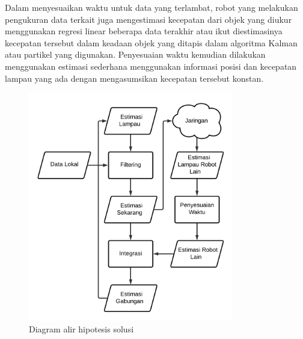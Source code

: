 Dalam menyesuaikan waktu untuk data yang terlambat, robot yang melakukan pengukuran data terkait juga mengestimasi kecepatan dari objek yang diukur menggunakan regresi linear beberapa data terakhir atau ikut diestimasinya kecepatan tersebut dalam keadaan objek yang ditapis dalam algoritma Kalman atau partikel yang digunakan. Penyesuaian waktu kemudian dilakukan menggunakan estimasi sederhana menggunakan informasi posisi dan kecepatan lampau yang ada dengan mengasumsikan kecepatan tersebut konstan.

\begin{figure}[h]
    \centering
    \includegraphics[width=0.8\textwidth]{resources/solution-flowchart.png}
    \caption{Diagram alir hipotesis solusi}
    \label{fig:solution-flowchart}
\end{figure}

